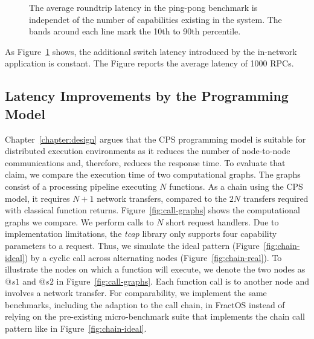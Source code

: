\begin{figure}[H]
  \centering
  
  \caption{\label{fig:roundtrip-ping-pong} The average roundtrip latency in the ping-pong benchmark is independet of the number of capabilities existing in the system. The bands around each line mark the 10th to 90th percentile.}
\end{figure}

As Figure~\ref{fig:roundtrip-ping-pong} shows, the additional switch latency introduced by the in-network application is constant. The Figure reports the average latency of 1000 \acp{RPC}.

\subsection{Latency Improvements by the Programming Model}
Chapter~\ref{chapter:design} argues that the \ac{CPS} programming model is suitable for distributed execution environments as it reduces the number of node-to-node communications and, therefore, reduces the response time. To evaluate that claim, we compare the execution time of two computational graphs. The graphs consist of a processing pipeline executing $N$ functions. As a chain using the \ac{CPS} model, it requires $N+1$ network transfers, compared to the $2N$ transfers required with classical function returns. Figure~\ref{fig:call-graphs} shows the computational graphs we compare. We perform calls to $N$ short request handlers. Due to implementation limitations, the \emph{tcap} library only supports four capability parameters to a request. Thus, we simulate the ideal pattern (Figure~\ref{fig:chain-ideal}) by a cyclic call across alternating nodes (Figure~\ref{fig:chain-real}). To illustrate the nodes on which a function will execute, we denote the two nodes as $@s1$ and $@s2$ in Figure~\ref{fig:call-graphs}. Each function call is to another node and involves a network transfer.
For comparability, we implement the same benchmarks, including the adaption to the call chain, in FractOS instead of relying on the pre-existing micro-benchmark suite that implements the chain call pattern like in Figure~\ref{fig:chain-ideal}.\@

